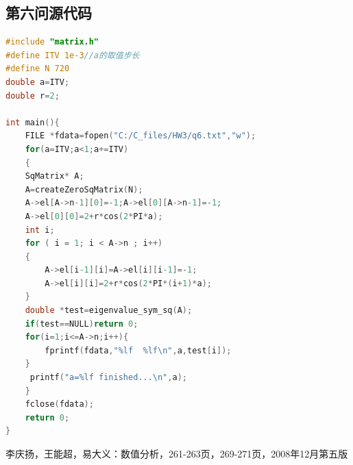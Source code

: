 \documentclass[10pt, a4paper]{article}
\begin{document}
    \subsection{第六问源代码}
    \begin{lstlisting}[language=C]
#include "matrix.h"
#define ITV 1e-3//a的取值步长
#define N 720
double a=ITV;
double r=2;

int main(){
    FILE *fdata=fopen("C:/C_files/HW3/q6.txt","w");
    for(a=ITV;a<1;a+=ITV)
    {
    SqMatrix* A;
    A=createZeroSqMatrix(N);
    A->el[A->n-1][0]=-1;A->el[0][A->n-1]=-1;
    A->el[0][0]=2+r*cos(2*PI*a);
    int i;
    for ( i = 1; i < A->n ; i++)
    {
        A->el[i-1][i]=A->el[i][i-1]=-1;
        A->el[i][i]=2+r*cos(2*PI*(i+1)*a);
    }
    double *test=eigenvalue_sym_sq(A);
    if(test==NULL)return 0;
    for(i=1;i<=A->n;i++){
        fprintf(fdata,"%lf  %lf\n",a,test[i]);
    }
     printf("a=%lf finished...\n",a);
    }
    fclose(fdata);
    return 0;
}
    \end{lstlisting}
    \begin{thebibliography}{99}  
        李庆扬，王能超，易大义：数值分析，261-263页，269-271页，2008年12月第五版
    \end{thebibliography}
\end{document}

